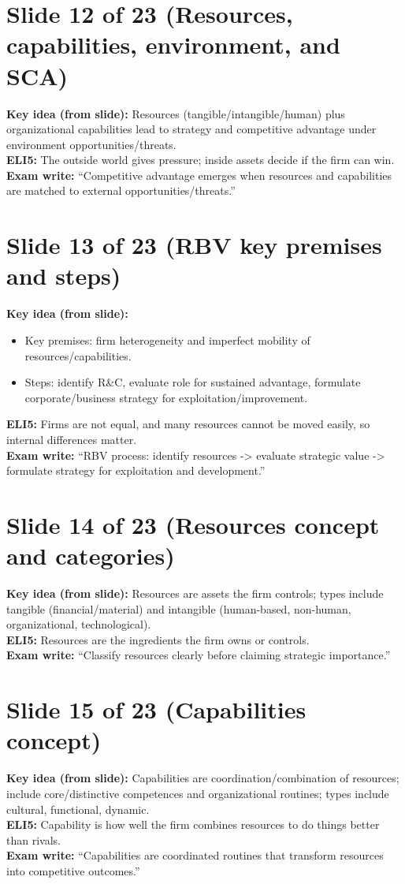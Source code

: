 \documentclass[11pt,a4paper]{article}
\begin{document}
\section*{Slide 12 of 23 (Resources, capabilities, environment, and SCA)}
\textbf{Key idea (from slide):} Resources (tangible/intangible/human) plus organizational capabilities lead to strategy and competitive advantage under environment opportunities/threats.\\
\textbf{ELI5:} The outside world gives pressure; inside assets decide if the firm can win.\\
\textbf{Exam write:} ``Competitive advantage emerges when resources and capabilities are matched to external opportunities/threats.''

\section*{Slide 13 of 23 (RBV key premises and steps)}
\textbf{Key idea (from slide):}
\begin{itemize}
  \item Key premises: firm heterogeneity and imperfect mobility of resources/capabilities.
  \item Steps: identify R\&C, evaluate role for sustained advantage, formulate corporate/business strategy for exploitation/improvement.
\end{itemize}
\textbf{ELI5:} Firms are not equal, and many resources cannot be moved easily, so internal differences matter.\\
\textbf{Exam write:} ``RBV process: identify resources -> evaluate strategic value -> formulate strategy for exploitation and development.''

\section*{Slide 14 of 23 (Resources concept and categories)}
\textbf{Key idea (from slide):} Resources are assets the firm controls; types include tangible (financial/material) and intangible (human-based, non-human, organizational, technological).\\
\textbf{ELI5:} Resources are the ingredients the firm owns or controls.\\
\textbf{Exam write:} ``Classify resources clearly before claiming strategic importance.''

\section*{Slide 15 of 23 (Capabilities concept)}
\textbf{Key idea (from slide):} Capabilities are coordination/combination of resources; include core/distinctive competences and organizational routines; types include cultural, functional, dynamic.\\
\textbf{ELI5:} Capability is how well the firm combines resources to do things better than rivals.\\
\textbf{Exam write:} ``Capabilities are coordinated routines that transform resources into competitive outcomes.''
\end{document}
